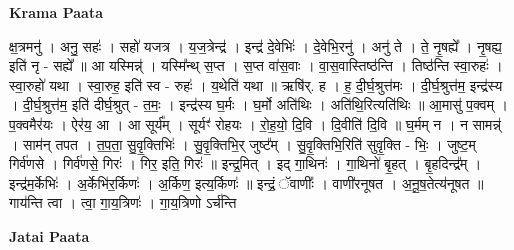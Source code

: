 \documentclass[17pt]{extarticle}
\begin{document}
\textbf{Krama Paata} \newline

क्ष॒त्रमनु॑ । अनु॒ सहः॑ । सहो॑ यजत्र । य॒ज॒त्रेन्द्र॑ । इन्द्र॑ दे॒वेभिः॑ । दे॒वेभि॒रनु॑ । अनु॑ ते । ते॒ नृ॒षह्ये᳚ । नृ॒षह्य॒ इति॑ नृ - सह्ये᳚ ॥ आ यस्मिन्न्॑ । यस्मि᳚न्थ् स॒प्त । स॒प्त वा॑स॒वाः । वा॒स॒वास्तिष्ठ॑न्ति । तिष्ठ॑न्ति स्वा॒रुहः॑ । स्वा॒रुहो॑ यथा । स्वा॒रुह॒ इति॑ स्व - रुहः॑ । य॒थेति॑ यथा ॥ ऋषि॑र्. ह । ह॒ दी॒र्घ॒श्रुत्त॑मः । दी॒र्घ॒श्रुत्त॑म॒ इन्द्र॑स्य । दी॒र्घ॒श्रुत्त॑म॒ इति॑ दीर्घ॒श्रुत् - त॒मः॒ । इन्द्र॑स्य घ॒र्मः । घ॒र्मो अति॑थिः । अति॑थि॒रित्यति॑थिः ॥ आ॒मासु॑ प॒क्वम् । प॒क्वमैर॑यः । ऐर॑य॒ आ । आ सूर्य᳚म् । सूर्यꣳ॑ रोहयः । रो॒ह॒यो॒ दि॒वि । दि॒वीति॑ दि॒वि ॥ घ॒र्मम् न । न सामन्न्॑ । साम॑न् तपत । त॒प॒ता॒ सु॒वृ॒क्तिभिः॑ । सु॒वृ॒क्तिभि॒र् जुष्ट᳚म् । सु॒वृ॒क्तिभि॒रिति॑ सुवृ॒क्ति - भिः॒ । जुष्ट॒म् गिर्व॑णसे । गिर्व॑णसे॒ गिरः॑ । गिर॒ इति॒ गिरः॑ ॥ इन्द्र॒मित् । इद् गा॒थिनः॑ । गा॒थिनो॑ बृ॒हत् । बृ॒हदिन्द्र᳚म् । इन्द्र॑म॒र्केभिः॑ । अ॒र्केभि॑र॒र्किणः॑ । अ॒र्किण॒ इत्य॒र्किणः॑ ॥ इन्द्रं॒ ॅवाणीः᳚ । वाणी॑रनूषत । अ॒नू॒ष॒तेत्य॑नूषत ॥ गाय॑न्ति त्वा । त्वा॒ गा॒य॒त्रिणः॑ । गा॒य॒त्रिणो ऽर्च॑न्ति \newline

\textbf{Jatai Paata} \newline
\end{document}
